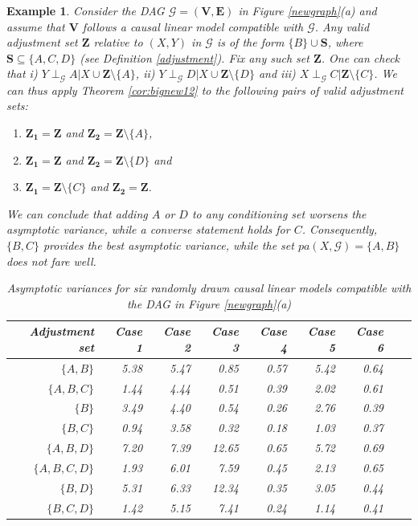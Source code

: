 \documentclass[11pt,a4paper]{article}
\newtheorem{Example}[Satz]{Example}
\theoremstyle{definition}
\theoremstyle{remark}
\newcommand{\g}[1][G]{\mathcal{#1}}
\begin{document}
\begin{Example}
	Consider the DAG $\g = (\mathbf{V},\mathbf{E})$ in Figure \ref{newgraph}(a) and assume that $\mathbf{V}$ follows a causal linear model compatible with $\g$. Any valid adjustment set $\mathbf{Z}$ relative to $(X,Y)$ in $\g$ is of the form $\{B\} \cup \mathbf{S}$, where $\mathbf{S} \subseteq \{A,C,D\}$ (see Definition \ref{adjustment}).
	Fix any such set $\mathbf{Z}$. One can check that i) $Y \perp_{\g} A | X \cup \mathbf{Z} \setminus \{A\}$, ii) $Y \perp_{\g} D | X \cup \mathbf{Z} \setminus \{D\}$  and iii) $X \perp_{\g} C | \mathbf{Z} \setminus \{C\}$. 
	We can thus apply Theorem \ref{cor:bignew12} to the following pairs of valid adjustment sets:
	\begin{enumerate}
		\item  $\mathbf{Z_1} = \mathbf{Z}$ and $\mathbf{Z_2}=\mathbf{Z} \setminus \{A\}$,
		\item  $\mathbf{Z_1} = \mathbf{Z}$ and $\mathbf{Z_2}=\mathbf{Z} \setminus \{D\}$ and
		\item $\mathbf{Z_1}=\mathbf{Z} \setminus \{C\}$ and $\mathbf{Z_2} = \mathbf{Z}$.
	\end{enumerate} 
	We can conclude that adding $A$ or $D$ to any conditioning set worsens the asymptotic variance, while a converse statement holds for $C$. Consequently, $\{B,C\}$ provides the best asymptotic variance, while the set $pa(X,\g)=\{A,B\}$ does not fare well. 
	
	\begin{table}
		\caption{Asymptotic variances for six randomly drawn causal linear models compatible with the DAG in Figure \ref{newgraph}(a) \label{asyvar}}
		\centering
		\begin{tabular}{r|rrrrrrrr}
			Adjustment set & Case 1 & Case 2 & Case 3 & Case 4 & Case 5 & Case 6 \\ 
			\hline
			$\{A,B\}$ & 5.38 & 5.47 & 0.85 & 0.57 & 5.42 & 0.64  \\ 
			$\{A,B,C\}$ & 1.44 & 4.44 & 0.51 & 0.39 & 2.02 & 0.61  \\ 
			$\{B\}$ & 3.49 & 4.40 & 0.54 & 0.26 & 2.76 & 0.39  \\ 
			$\{B,C\}$ & 0.94 & 3.58 & 0.32 & 0.18 & 1.03 & 0.37  \\ 
			$\{A,B,D\}$ & 7.20 & 7.39 & 12.65 & 0.65 & 5.72 & 0.69  \\ 
			$\{A,B,C,D\}$ & 1.93 & 6.01 & 7.59 & 0.45 & 2.13 & 0.65  \\ 
			$\{B,D\}$ & 5.31 & 6.33 & 12.34 & 0.35 & 3.05 & 0.44  \\ 
			$\{B,C,D\}$ & 1.42 & 5.15 & 7.41 & 0.24 & 1.14 & 0.41  \\ 
		\end{tabular}
	\end{table}
	

\end{Example}
\end{document}
